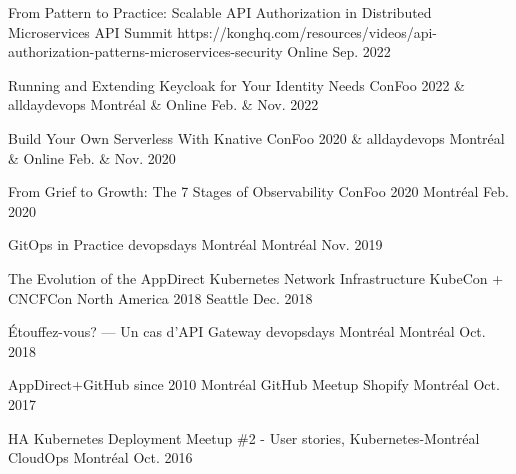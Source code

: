 \begin{cvhonors}

  \cvhonor
    {From Pattern to Practice: Scalable API Authorization in Distributed Microservices} %
    {API Summit} %
    {https://konghq.com/resources/videos/api-authorization-patterns-microservices-security} %
    {Online} %
    {Sep. 2022} %

  \cvhonor
    {Running and Extending Keycloak for Your Identity Needs} %
    {ConFoo 2022 \& alldaydevops} %
    {} %
    {Montréal \& Online} %
    {Feb. \& Nov. 2022} %

  \cvhonor
    {Build Your Own Serverless With Knative} %
    {ConFoo 2020 \& alldaydevops} %
    {} %
    {Montréal \& Online} %
    {Feb. \& Nov. 2020} %

  \cvhonor
    {From Grief to Growth: The 7 Stages of Observability} %
    {ConFoo 2020} %
    {} %
    {Montréal} %
    {Feb. 2020} %

  \cvhonor
    {GitOps in Practice} %
    {devopsdays Montréal} %
    {} %
    {Montréal} %
    {Nov. 2019} %

  \cvhonor
    {The Evolution of the AppDirect Kubernetes Network Infrastructure} %
    {KubeCon + CNCFCon North America 2018} %
    {} %
    {Seattle} %
    {Dec. 2018} %

  \cvhonor
    {Étouffez-vous? — Un cas d’API Gateway} %
    {devopsdays Montréal} %
    {} %
    {Montréal} %
    {Oct. 2018} %

  \cvhonor
    {AppDirect+GitHub since 2010} %
    {Montréal GitHub Meetup} %
    {} %
    {Shopify Montréal} %
    {Oct. 2017} %

  \cvhonor
    {HA Kubernetes Deployment} %
    {Meetup \#2 - User stories, Kubernetes-Montréal} %
    {} %
    {CloudOps Montréal} %
    {Oct. 2016} %

\end{cvhonors}